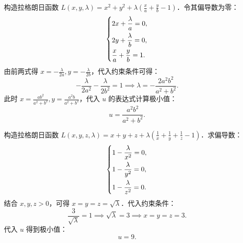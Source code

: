 \begin{solution}

    构造拉格朗日函数 $L(x, y, \lambda) = x^{2} + y^{2} + \lambda \left( \frac{x}{a} + \frac{y}{b} - 1 \right)$．令其偏导数为零：
    \begin{equation}
        \label{eq:p1-lagrange}
        \begin{dcases}
            2x + \frac{\lambda}{a} = 0, \\
            2y + \frac{\lambda}{b} = 0, \\
            \frac{x}{a} + \frac{y}{b} = 1.
        \end{dcases}
    \end{equation}
    由前两式得 $x = -\frac{\lambda}{2a}, y = -\frac{\lambda}{2b}$，代入约束条件可得：
    \begin{equation}
        -\frac{\lambda}{2 a^{2}} - \frac{\lambda}{2 b^{2}} = 1 \implies \lambda = -\frac{2 a^{2} b^{2}}{a^{2} + b^{2}}.
    \end{equation}
    此时 $x = \frac{a b^{2}}{a^{2} + b^{2}}, y = \frac{a^{2} b}{a^{2} + b^{2}}$，代入 $u$ 的表达式计算极小值：
    \begin{equation}
        \boxed{u = \frac{a^{2} b^{2}}{a^{2} + b^{2}}}.
    \end{equation}


    构造拉格朗日函数 $L(x, y, z, \lambda) = x + y + z + \lambda \left( \frac{1}{x} + \frac{1}{y} + \frac{1}{z} - 1 \right)$．求偏导数：
    \begin{equation}
        \begin{dcases}
            1 - \frac{\lambda}{x^{2}} = 0, \\
            1 - \frac{\lambda}{y^{2}} = 0, \\
            1 - \frac{\lambda}{z^{2}} = 0.
        \end{dcases}
    \end{equation}
    结合 $x, y, z > 0$，可得 $x = y = z = \sqrt{\lambda}$．代入约束条件：
    \begin{equation}
        \frac{3}{\sqrt{\lambda}} = 1 \implies \sqrt{\lambda} = 3 \implies x = y = z = 3.
    \end{equation}
    代入 $u$ 得到极小值：
    \begin{equation}
        \boxed{u = 9}.
    \end{equation}



\end{solution}
